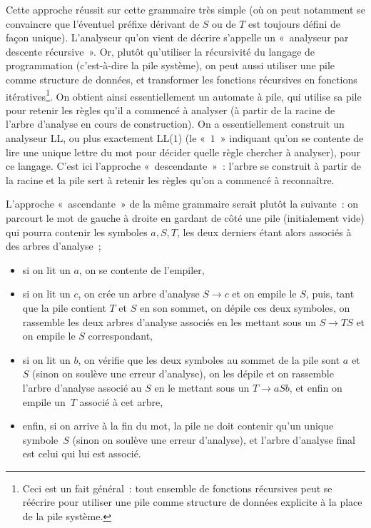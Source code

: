 \documentclass[12pt,a4paper]{article}
\theoremstyle{definition}
\begin{document}
\smallskip

Cette approche réussit sur cette grammaire très simple (où on peut
notamment se convaincre que l'éventuel préfixe dérivant de $S$ ou de
$T$ est toujours défini de façon unique).  L'analyseur qu'on vient de
décrire s'appelle un « analyseur par descente récursive ».  Or, plutôt
qu'utiliser la récursivité du langage de programmation (c'est-à-dire
la pile système), on peut aussi utiliser une pile comme structure de
données, et transformer les fonctions récursives en fonctions
itératives\footnote{Ceci est un fait général : tout ensemble de
  fonctions récursives peut se réécrire pour utiliser une pile comme
  structure de données explicite à la place de la pile système.}.  On
obtient ainsi essentiellement un automate à pile, qui utilise sa pile
pour retenir les règles qu'il a commencé à analyser (à partir de la
racine de l'arbre d'analyse en cours de construction).  On a
essentiellement construit un analyseur LL, ou plus exactement LL($1$)
(le « $1$ » indiquant qu'on se contente de lire une unique lettre du
mot pour décider quelle règle chercher à analyser), pour ce langage.
C'est ici l'approche « descendante » : l'arbre se construit à partir
de la racine et la pile sert à retenir les règles qu'on a commencé à
reconnaître.

\medbreak

L'approche « ascendante » de la même grammaire serait plutôt la
suivante : on parcourt le mot de gauche à droite en gardant de côté
une pile (initialement vide) qui pourra contenir les symboles $a,S,T$,
les deux derniers étant alors associés à des arbres d'analyse ;
\begin{itemize}
\item si on lit un $a$, on se contente de l'empiler,
\item si on lit un $c$, on crée un arbre d'analyse $S\rightarrow c$ et
  on empile le $S$, puis, tant que la pile contient $T$ et $S$ en son
  sommet, on dépile ces deux symboles, on rassemble les deux arbres
  d'analyse associés en les mettant sous un $S\rightarrow TS$ et on
  empile le $S$ correspondant,
\item si on lit un $b$, on vérifie que les deux symboles au sommet de
  la pile sont $a$ et $S$ (sinon on soulève une erreur d'analyse), on
  les dépile et on rassemble l'arbre d'analyse associé au $S$ en le
  mettant sous un $T\rightarrow aSb$, et enfin on empile un $T$
  associé à cet arbre,
\item enfin, si on arrive à la fin du mot, la pile ne doit contenir
  qu'un unique symbole $S$ (sinon on soulève une erreur d'analyse), et
  l'arbre d'analyse final est celui qui lui est associé.
\end{itemize}
\end{document}
